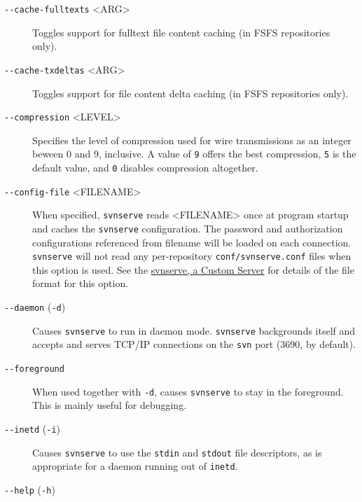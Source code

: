 \begin{description}
\item[\protect{}\label{svn.ref.svnserve.sw.cache_fulltexts}{}\texttt{-\/-cache-fulltexts}
\textless ARG\textgreater{}]
Toggles support for fulltext file content caching (in FSFS repositories
only).
\item[\protect{}\label{svn.ref.svnserve.sw.cache_txdeltas}{}\texttt{-\/-cache-txdeltas}
\textless ARG\textgreater{}]
Toggles support for file content delta caching (in FSFS repositories
only).
\item[\protect{}\label{svn.ref.svnserve.sw.compression}{}\texttt{-\/-compression}
\textless LEVEL\textgreater{}]
Specifies the level of compression used for wire transmissions as an
integer beween 0 and 9, inclusive. A value of \texttt{9} offers the best
compression, \texttt{5} is the default value, and \texttt{0} disables
compression altogether.
\item[\protect{}\label{svn.ref.svnserve.sw.config_file}{}\texttt{-\/-config-file}
\textless FILENAME\textgreater{}]
When specified, \texttt{svnserve} reads \textless FILENAME\textgreater{}
once at program startup and caches the \texttt{svnserve} configuration.
The password and authorization configurations referenced from filename
will be loaded on each connection. \texttt{svnserve} will not read any
per‐repository \texttt{conf/svnserve.conf} files when this option is
used. See the \hyperref[svn.serverconfig.svnserve]{svnserve, a Custom
Server} for details of the file format for this option.
\item[\protect{}\label{svn.ref.svnserve.sw.daemon}{}\texttt{-\/-daemon}
(\texttt{-d})]
Causes \texttt{svnserve} to run in daemon mode. \texttt{svnserve}
backgrounds itself and accepts and serves TCP/IP connections on the
\texttt{svn} port (3690, by default).
\item[\protect{}\label{svn.ref.svnserve.sw.foreground}{}\texttt{-\/-foreground}]
When used together with \texttt{-d}, causes \texttt{svnserve} to stay in
the foreground. This is mainly useful for debugging.
\item[\protect{}\label{svn.ref.svnserve.sw.inetd}{}\texttt{-\/-inetd}
(\texttt{-i})]
Causes \texttt{svnserve} to use the \texttt{stdin} and \texttt{stdout}
file descriptors, as is appropriate for a daemon running out of
\texttt{inetd}.
\item[\protect{}\label{svn.ref.svnserve.sw.help}{}\texttt{-\/-help}
(\texttt{-h})]

\end{description}
